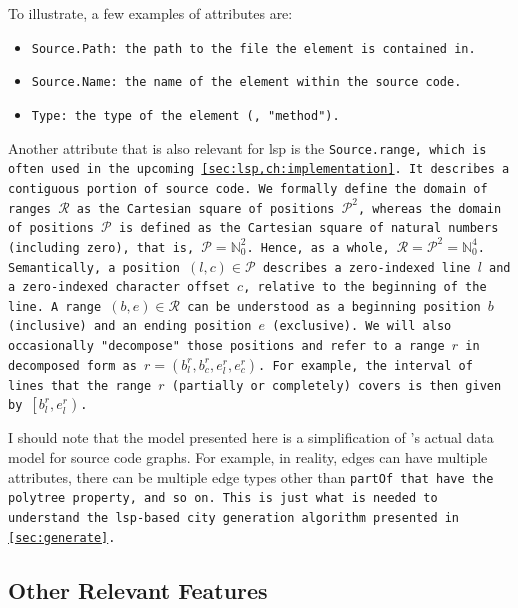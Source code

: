 \documentclass[../thesis]{subfiles}
\begin{document}
To illustrate, a few examples of attributes are:
\begin{itemize}
	\item \tt{Source.Path}: the path to the file the element is contained in.
	\item \tt{Source.Name}: the name of the element within the source code.
	\item \tt{Type}: the type of the element (\eg{}, "method").
\end{itemize}

Another attribute that is also relevant for \gls{lsp} is the \tt{Source.\allowbreak\Gls*{range}}, which is often used in the upcoming \cref{sec:lsp,ch:implementation}.
It describes a contiguous portion of source code.
We formally define the domain of ranges $\mathcal{R}$ as the Cartesian square of positions $\mathcal{P}^2$, whereas the domain of positions $\mathcal{P}$ is defined as the Cartesian square of natural numbers (including zero), that is, $\mathcal{P} = \mathbb{N}^2_0$.
Hence, as a whole, $\mathcal{R} = \mathcal{P}^2 = \mathbb{N}^4_0$.
Semantically, a position $(l, c) \in \mathcal{P}$ describes a zero-indexed line $l$ and a zero-indexed character offset $c$, relative to the beginning of the line.
A range $(b, e) \in \mathcal{R}$ can be understood as a beginning position $b$ (inclusive) and an ending position $e$ (exclusive).
We will also occasionally "decompose" those positions and refer to a range $r$ in decomposed form as $r = \left(b_l^r, b_c^r, e_l^r, e_c^r\right)$.
For example, the interval of lines that the range $r$ (partially or completely) covers is then given by $\left[b_l^r, e_l^r\right)$.

I should note that the model presented here is a simplification of \SEE{}'s actual data model for source code graphs.
For example, in reality, edges can have multiple attributes, there can be multiple edge types other than \tt{partOf} that have the \gls{polytree} property, and so on.
This is just what is needed to understand the \gls{lsp}-based city generation algorithm presented in \cref{sec:generate}.



\subsection{Other Relevant Features}\label{subsec:seeother}
\end{document}
